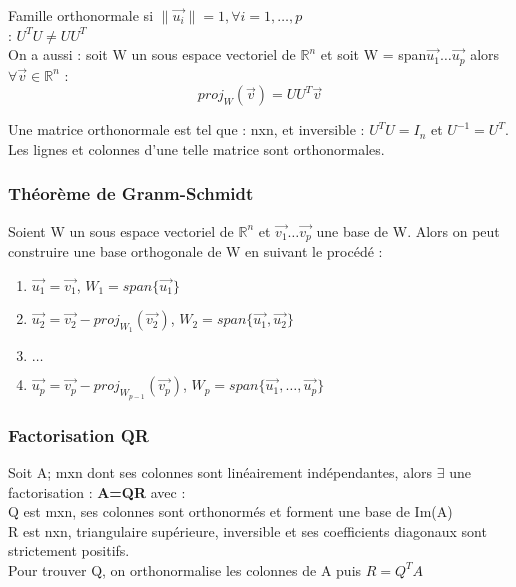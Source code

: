 \documentclass[../main.tex]{subfiles}
\begin{document}
Famille orthonormale si $\rVert \vec{u_i} \rVert = 1, \forall i=1,\dots,p$\\


\warning : $U^TU \neq UU^T$\\

On a aussi : soit W un sous espace vectoriel de $\mathbb{R}^n$ et soit W = span{$\vec{u_1} \dots \vec{u_p}$} alors $\forall \vec{v}\in \mathbb{R}^n$ :\\
\begin{equation}
    proj_W(\vec{v}) = UU^T\vec{v}
\end{equation}

Une matrice orthonormale est tel que : nxn, et inversible : $U^TU=I_n$ et $U^{-1} = U^T$. Les lignes et colonnes d'une telle matrice sont orthonormales.\\

\subsubsection{Théorème de Granm-Schmidt}
Soient W un sous espace vectoriel de $\mathbb{R}^n$ et {$\vec{v_1} \dots \vec{v_p}$} une base de W. Alors on peut construire une base orthogonale de W en suivant le procédé :\\
\begin{enumerate}
    \item $\vec{u_1} = \vec{v_1}$, $W_1 = span\{\vec{u_1}\}$\\
    \item $\vec{u_2} = \vec{v_2} - proj_{W_1}(\vec{v_2})$, $W_2 = span\{\vec{u_1}, \vec{u_2}\}$\\
    \item $\dots$\\
    \item $\vec{u_p} = \vec{v_p} - proj_{W_{p-1}}(\vec{v_p})$, $W_p = span\{\vec{u_1},\dots, \vec{u_p}\}$\\
\end{enumerate}



\subsubsection{Factorisation QR}
Soit A; mxn dont ses colonnes sont linéairement indépendantes, alors $\exists$ une factorisation : \textbf{A=QR} avec :\\
Q est mxn, ses colonnes sont orthonormés et forment une base de Im(A)\\
R est nxn, triangulaire supérieure, inversible et ses coefficients diagonaux sont strictement positifs.\\
Pour trouver Q, on orthonormalise les colonnes de A puis $R=Q^TA$\\
\end{document}
